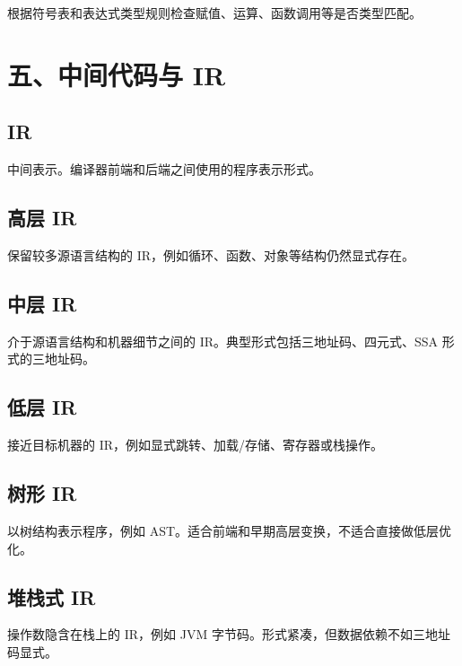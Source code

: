 \documentclass[UTF8,zihao=-4]{ctexart}
\begin{document}
根据符号表和表达式类型规则检查赋值、运算、函数调用等是否类型匹配。

\section*{五、中间代码与 IR}

\subsection*{IR}

中间表示。编译器前端和后端之间使用的程序表示形式。

\subsection*{高层 IR}

保留较多源语言结构的 IR，例如循环、函数、对象等结构仍然显式存在。

\subsection*{中层 IR}

介于源语言结构和机器细节之间的 IR。典型形式包括三地址码、四元式、SSA 形式的三地址码。

\subsection*{低层 IR}

接近目标机器的 IR，例如显式跳转、加载/存储、寄存器或栈操作。

\subsection*{树形 IR}

以树结构表示程序，例如 AST。适合前端和早期高层变换，不适合直接做低层优化。

\subsection*{堆栈式 IR}

操作数隐含在栈上的 IR，例如 JVM 字节码。形式紧凑，但数据依赖不如三地址码显式。
\end{document}
